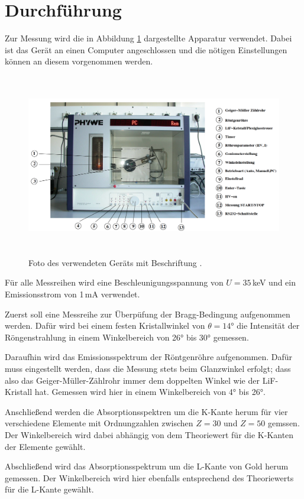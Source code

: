 \section{Durchführung}
\label{sec:Durchführung}

Zur Messung wird die in Abbildung \ref{fig:geraet} dargestellte Apparatur verwendet.
Dabei ist das Gerät an einen Computer angeschlossen und die nötigen Einstellungen
können an diesem vorgenommen werden.

\begin{figure}
  \centering
  \includegraphics[height=8cm]{data/geraet.png}
  \caption{Foto des verwendeten Geräts mit Beschriftung \cite{Versuchsanleitung}.}
  \label{fig:geraet}
\end{figure}

Für alle Messreihen wird eine Beschleunigungsspannung von $U=35\,$keV und ein
Emissionsstrom von 1\,mA verwendet.

Zuerst soll eine Messreihe zur Überpüfung der Bragg-Bedingung aufgenommen werden.
Dafür wird bei einem festen Kristallwinkel von $\theta=14°$ die Intensität der
Röngenstrahlung in einem Winkelbereich von 26° bis 30° gemessen.

Daraufhin wird das Emissionsspektrum der Röntgenröhre aufgenommen. Dafür muss eingestellt
werden, dass die Messung stets beim Glanzwinkel erfolgt; dass also das Geiger-Müller-Zählrohr
immer dem doppelten Winkel wie der LiF-Kristall hat. Gemessen wird hier in einem
Winkelbereich von 4° bis 26°.

Anschließend werden die Absorptionsspektren um die K-Kante herum für vier verschiedene
Elemente mit Ordnungzahlen zwischen $Z=30$ und $Z=50$ gemssen. Der Winkelbereich wird
dabei abhängig von dem Theoriewert für die K-Kanten der Elemente gewählt.

Abschließend wird das Absorptionsspektrum um die L-Kante von Gold herum gemessen.
Der Winkelbereich wird hier ebenfalls entsprechend des Theoriewerts für die
L-Kante gewählt.
